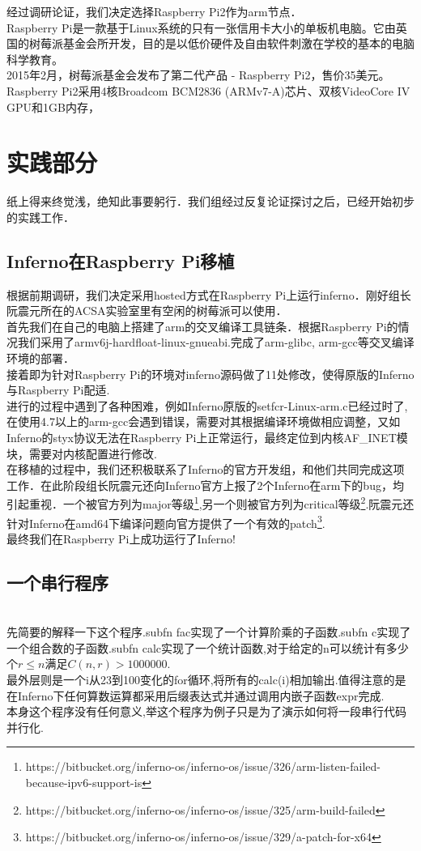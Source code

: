 \documentclass[paper=a4]{ctexart} %
\numberwithin{equation}{section} %
\numberwithin{figure}{section} %
\numberwithin{table}{section} %
\newcommand{\n}{\\\indent}
\begin{document}
经过调研论证，我们决定选择Raspberry Pi2作为arm节点．\n
Raspberry Pi是一款基于Linux系统的只有一张信用卡大小的单板机电脑。它由英国的树莓派基金会所开发，目的是以低价硬件及自由软件刺激在学校的基本的电脑科学教育。\n
2015年2月，树莓派基金会发布了第二代产品 - Raspberry Pi2，售价35美元。Raspberry Pi2采用4核Broadcom BCM2836 (ARMv7-A)芯片、双核VideoCore IV GPU和1GB内存，\n

\section{实践部分}
纸上得来终觉浅，绝知此事要躬行．我们组经过反复论证探讨之后，已经开始初步的实践工作．

\subsection{Inferno在Raspberry Pi移植}
根据前期调研，我们决定采用hosted方式在Raspberry Pi上运行inferno．刚好组长阮震元所在的ACSA实验室里有空闲的树莓派可以使用．\n
首先我们在自己的电脑上搭建了arm的交叉编译工具链条．根据Raspberry Pi的情况我们采用了armv6j-hardfloat-linux-gnueabi.完成了arm-glibc, arm-gcc等交叉编译环境的部署．　\n
接着即为针对Raspberry Pi的环境对inferno源码做了11处修改，使得原版的Inferno与Raspberry Pi配适. \n
进行的过程中遇到了各种困难，例如Inferno原版的setfcr-Linux-arm.c已经过时了,在使用4.7以上的arm-gcc会遇到错误，需要对其根据编译环境做相应调整，又如Inferno的styx协议无法在Raspberry Pi上正常运行，最终定位到内核AF\_INET模块，需要对内核配置进行修改. \n
 在移植的过程中，我们还积极联系了Inferno的官方开发组，和他们共同完成这项工作．在此阶段组长阮震元还向Inferno官方上报了2个Inferno在arm下的bug，均引起重视．一个被官方列为major等级\footnote{https://bitbucket.org/inferno-os/inferno-os/issue/326/arm-listen-failed-because-ipv6-support-is},另一个则被官方列为critical等级\footnote{https://bitbucket.org/inferno-os/inferno-os/issue/325/arm-build-failed}.阮震元还针对Inferno在amd64下编译问题向官方提供了一个有效的patch\footnote{https://bitbucket.org/inferno-os/inferno-os/issue/329/a-patch-for-x64}.\n
最终我们在Raspberry Pi上成功运行了Inferno!
\subsection{一个串行程序}

~\n
先简要的解释一下这个程序.subfn fac实现了一个计算阶乘的子函数.subfn c实现了一个组合数的子函数.subfn calc实现了一个统计函数,对于给定的n可以统计有多少个$r\leq n$满足$C(n,r) > 1000000$.\n
最外层则是一个i从23到100变化的for循环,将所有的calc(i)相加输出.值得注意的是在Inferno下任何算数运算都采用后缀表达式并通过调用内嵌子函数expr完成.\n
本身这个程序没有任何意义,举这个程序为例子只是为了演示如何将一段串行代码并行化.
\end{document}
